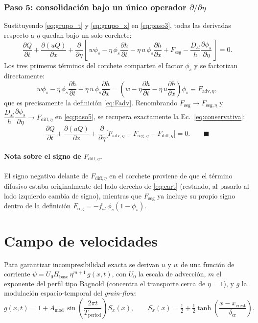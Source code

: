 \documentclass[11pt,a4paper]{article}
\newcommand{\pd}[2]{\dfrac{\partial #1}{\partial #2}}
\begin{document}
\subsubsection{Paso 5: consolidación bajo un único operador $\partial/\partial\eta$}
Sustituyendo \eqref{eq:grupo_t} y \eqref{eq:grupo_x} en \eqref{eq:paso3},
todas las derivadas respecto a $\eta$ quedan bajo un solo corchete:
\begin{equation}
    \pd{Q}{t} + \pd{(uQ)}{x}
    + \pd{}{\eta}\left[\, w\phi_s - \eta\,\phi_s\pd{h}{t} - \eta\,u\,\phi_s\pd{h}{x}
    + F_{\mathrm{seg}} - \frac{D_{sl}}{h}\pd{\phi_s}{\eta} \,\right] = 0.
    \label{eq:paso5}
\end{equation}
Los tres primeros términos del corchete comparten el factor $\phi_s$ y se
factorizan directamente:
\begin{equation}
    w\phi_s - \eta\,\phi_s\pd{h}{t} - \eta\,u\,\phi_s\pd{h}{x}
    = \left(w - \eta\pd{h}{t} - \eta\,u\pd{h}{x}\right)\phi_s
    \equiv F_{\mathrm{adv},\eta},
\end{equation}
que es precisamente la definición \eqref{eq:Fadv}. Renombrando
$F_{\mathrm{seg}}\to F_{\mathrm{seg},\eta}$ y
$\dfrac{D_{sl}}{h}\dfrac{\partial\phi_s}{\partial\eta}\to F_{\mathrm{diff},\eta}$
en \eqref{eq:paso5}, se recupera exactamente la Ec.~\eqref{eq:conservativa}:
\begin{equation}
    \pd{Q}{t} + \pd{(uQ)}{x}
    + \pd{}{\eta}\Big[F_{\mathrm{adv},\eta} + F_{\mathrm{seg},\eta} - F_{\mathrm{diff},\eta}\Big] = 0. \qquad\blacksquare
\end{equation}

\paragraph{Nota sobre el signo de $F_{\mathrm{diff},\eta}$.} El signo
negativo delante de $F_{\mathrm{diff},\eta}$ en el corchete proviene de
que el término difusivo estaba originalmente del lado derecho de
\eqref{eq:cart} (restando, al pasarlo al lado izquierdo cambia de signo),
mientras que $F_{\mathrm{seg}}$ ya incluye su propio signo dentro de la
definición $F_{\mathrm{seg}}=-f_{sl}\,\phi_s(1-\phi_s)$.

\section{Campo de velocidades}
\label{sec:vel}
Para garantizar incompresibilidad exacta se derivan $u$ y $w$ de una
función de corriente $\psi = U_0 H_{\mathrm{base}}\,\eta^{m+1}\,g(x,t)$, con
$U_0$ la escala de advección, $m$ el exponente del perfil tipo Bagnold
(concentra el transporte cerca de $\eta=1$), y $g$ la modulación
espacio-temporal del \emph{grain-flow}:
\begin{equation}
    g(x,t) = 1 + A_{\mathrm{mod}}\,\sin\!\left(\frac{2\pi t}{T_{\mathrm{period}}}\right) S_x(x),
    \qquad
    S_x(x) = \tfrac12 + \tfrac12\tanh\!\left(\frac{x-x_{\mathrm{crest}}}{\delta_{\mathrm{cr}}}\right).
\end{equation}
\end{document}
